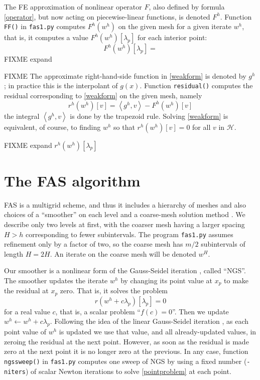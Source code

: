 \documentclass[letterpaper,final,12pt,reqno]{amsart}
\newcommand{\ip}[2]{\left<#1,#2\right>}
\begin{document}
The FE approximation of nonlinear operator $F$, also defined by formula \eqref{operator}, but now acting on piecewise-linear functions, is denoted $F^h$.  Function \texttt{FF()} in \texttt{fas1.py} computes $F^h(w^h)$ on the given mesh for a given iterate $w^h$, that is, it computes a value $F^h(w^h)[\lambda_p]$ for each interior point:
\begin{equation}
  F^h(w^h)[\lambda_p] =   \label{feoperator}
\end{equation}
FIXME expand

FIXME The approximate right-hand-side function in \eqref{weakform} is denoted by $g^h$; in practice this is the interpolant of $g(x)$.  Function \texttt{residual()} computes the residual corresponding to \eqref{weakform} on the given mesh, namely
\begin{equation}
  r^h(w^h)[v] = \ip{g^h}{v} - F^h(w^h)[v]  \label{feresidual}
\end{equation}
the integral $\ip{g^h}{v}$ is done by the trapezoid rule.  Solving \eqref{weakform} is equivalent, of course, to finding $w^h$ so that $r^h(w^h)[v]=0$ for all $v$ in $\mathcal{H}$.

FIXME expand $r^h(w^h)[\lambda_p]$


\section{The FAS algorithm}

FAS is a multigrid scheme, and thus it includes a hierarchy of meshes and also choices of a ``smoother'' on each level and a coarse-mesh solution method \cite{Briggsetal2000}.  We describe only two levels at first, with the coarser mesh having a larger spacing $H>h$ corresponding to fewer subintervals.  The program \texttt{fas1.py} assumes refinement only by a factor of two, so the coarse mesh has $m/2$ subintervals of length $H=2H$.  An iterate on the coarse mesh will be denoted $w^H$.

Our smoother is a nonlinear form of the Gauss-Seidel iteration \cite{Briggsetal2000}, called ``NGS''.  The smoother updates the iterate $w^h$ by changing its point value at $x_p$ to make the residual at $x_p$ zero.  That is, it solves the problem
\begin{equation}
r(w^h + c \lambda_p)[\lambda_p] = 0  \label{pointproblem}
\end{equation}
for a real value $c$, that is, a scalar problem ``$f(c)=0$''.  Then we update $w^h \longleftarrow w^h + c \lambda_p$.  Following the idea of the linear Gauss-Seidel iteration \cite{Bueler2021}, as each point value of $w^h$ is updated we use that value, and all already-updated values, in zeroing the residual at the next point.  However, as soon as the residual is made zero at the next point it is no longer zero at the previous.  In any case, function \texttt{ngssweep()} in \texttt{fas1.py} computes one sweep of NGS by using a fixed number (\texttt{-niters}) of scalar Newton iterations to solve \eqref{pointproblem} at each point.
\end{document}
